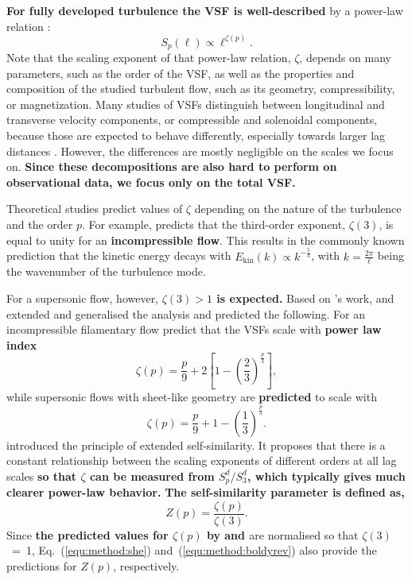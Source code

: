 \textbf{For fully developed turbulence the VSF is well-described} by a power-law relation \citep{Kolmogorov1941,She1994,Boldyrev2002}:
\begin{equation}
	\mathit{S}_p (\ell) \propto \ell^{\zeta(p)}.
    \label{equ:method:propto_zeta}
\end{equation}
Note that the scaling exponent of that power-law relation, $\zeta$, depends on many parameters, such as the order of the VSF, as well as the properties and composition of the studied turbulent flow, such as its geometry, compressibility, or magnetization.
Many studies of VSFs distinguish between longitudinal and transverse velocity components, or compressible and solenoidal components, because those are expected to behave differently, especially towards larger lag distances \citep{Gotoh2002,Schmidt2008,Benzi2010}.
However, the differences are mostly negligible on the scales we focus on. 
\textbf{Since these decompositions are also hard to perform on observational data, we focus only on the total VSF.}

Theoretical studies predict values of $\zeta$ depending on the nature of the turbulence and the order $p$.
For example, \citet{Kolmogorov1941} predicts that the third-order exponent, $\zeta(3)$, is equal to unity for an \textbf{incompressible flow}.
This results in the commonly known prediction that the kinetic energy decays with $E_{\mathrm{kin}}(k) \propto k^{-\frac{5}{3}}$, with $k = \frac{2 \pi}{\ell}$ being the wavenumber of the turbulence mode.

For a supersonic flow, however, \textbf{$\zeta(3) >1$ is expected.}
Based on \citeauthor{Kolmogorov1941}'s work, \citet{She1994} and \citet{Boldyrev2002} extended and generalised the analysis and predicted the following.
For an incompressible filamentary flow \citet{She1994} predict that
the VSFs scale with \textbf{power law index}
\begin{equation}
	\zeta(p) = \frac{p}{9} + 2 \left[ 1 - \left( \frac{2}{3} \right)^{\frac{p}{3}} \right] ,
	\label{equ:method:she}
\end{equation}
while supersonic flows with sheet-like geometry are \textbf{predicted} to scale with \citep{Boldyrev2002}
\begin{equation}
	\zeta(p) = \frac{p}{9} + 1 - \left( \frac{1}{3} \right)^{\frac{p}{3}}.
	\label{equ:method:boldyrev}
\end{equation}
\citet{Benzi1993} introduced the principle of extended self-similarity.
It proposes that there is a constant relationship between the scaling
exponents of different orders at all lag scales \textbf{so that $\zeta$ can be measured from $S^d_p/S^d_3$, which typically gives much clearer power-law behavior.}
\textbf{The self-similarity parameter is defined as,}
\begin{equation}
	Z(p) = \frac{\zeta(p)}{\zeta(3)}.
	\label{equ:method:z_def}
\end{equation} 
Since \textbf{the predicted values for $\zeta(p)$ by \citet{She1994} and \citet{Boldyrev2002}} are normalised so that $\zeta(3)$~=~1, Eq.~(\ref{equ:method:she}) and~(\ref{equ:method:boldyrev}) also provide the predictions for $Z(p)$, respectively.

